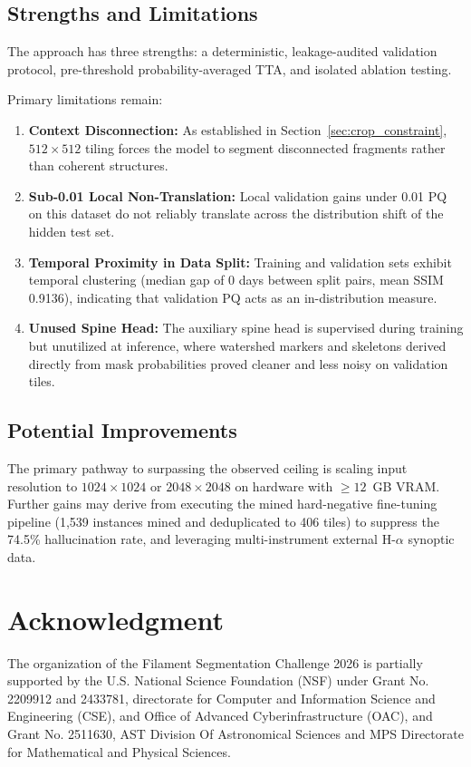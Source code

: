 \documentclass[sigconf]{acmart}
\begin{document}
\subsection{Strengths and Limitations}
The approach has three strengths: a deterministic, leakage-audited validation protocol, pre-threshold probability-averaged TTA, and isolated ablation testing. 

Primary limitations remain:
\begin{enumerate}
    \item \textbf{Context Disconnection:} As established in Section~\ref{sec:crop_constraint}, $512\times512$ tiling forces the model to segment disconnected fragments rather than coherent structures.
    \item \textbf{Sub-0.01 Local Non-Translation:} Local validation gains under 0.01 PQ on this dataset do not reliably translate across the distribution shift of the hidden test set.
    \item \textbf{Temporal Proximity in Data Split:} Training and validation sets exhibit temporal clustering (median gap of 0 days between split pairs, mean SSIM 0.9136), indicating that validation PQ acts as an in-distribution measure.
    \item \textbf{Unused Spine Head:} The auxiliary spine head is supervised during training but unutilized at inference, where watershed markers and skeletons derived directly from mask probabilities proved cleaner and less noisy on validation tiles.
\end{enumerate}

\subsection{Potential Improvements}
The primary pathway to surpassing the observed ceiling is scaling input resolution to $1024\times1024$ or $2048\times2048$ on hardware with $\ge12$~GB VRAM. Further gains may derive from executing the mined hard-negative fine-tuning pipeline (1,539 instances mined and deduplicated to 406 tiles) to suppress the 74.5\% hallucination rate, and leveraging multi-instrument external H-$\alpha$ synoptic data.

\section{Acknowledgment}\label{sec:acknowledgment}
    The organization of the Filament Segmentation Challenge 2026 is partially supported by the U.S. National Science Foundation (NSF) under Grant No. 2209912 and 2433781, directorate for Computer and Information Science and Engineering (CSE), and Office of Advanced Cyberinfrastructure (OAC), and Grant No. 2511630, AST Division Of Astronomical Sciences and MPS Directorate for Mathematical and Physical Sciences.
\end{document}
